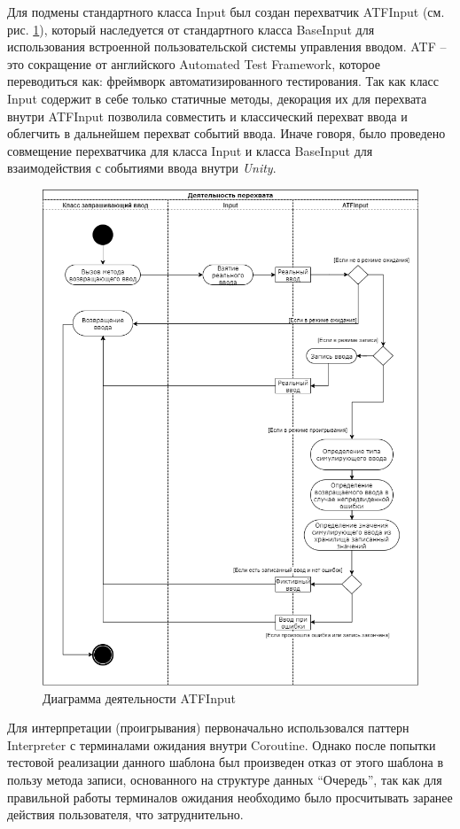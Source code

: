 Для подмены стандартного класса Input был создан перехватчик ATFInput (см. рис. \ref{atfInput}), который наследуется от стандартного класса BaseInput для использования встроенной пользовательской системы управления вводом. ATF -- это сокращение от английского Automated Test Framework, которое переводиться как: фреймворк автоматизированного тестирования. Так как класс Input содержит в себе только статичные методы, декорация их для перехвата внутри ATFInput позволила совместить и классический перехват ввода и облегчить в дальнейшем перехват событий ввода. Иначе говоря, было проведено совмещение перехватчика для класса Input и класса BaseInput  для взаимодействия с событиями ввода внутри \textit{Unity}. 

\begin{figure}[H]
	\centering
	\includegraphics[width=\linewidth]{atfInput.png}
	\caption{Диаграмма деятельности ATFInput}
	\label{atfInput}
\end{figure}


Для интерпретации (проигрывания) первоначально использовался паттерн Interpreter с терминалами ожидания внутри Coroutine. Однако после попытки тестовой реализации данного шаблона был произведен отказ от этого шаблона в пользу метода записи, основанного на структуре данных ``Очередь'', так как для правильной работы терминалов ожидания необходимо было просчитывать заранее действия пользователя, что затруднительно.